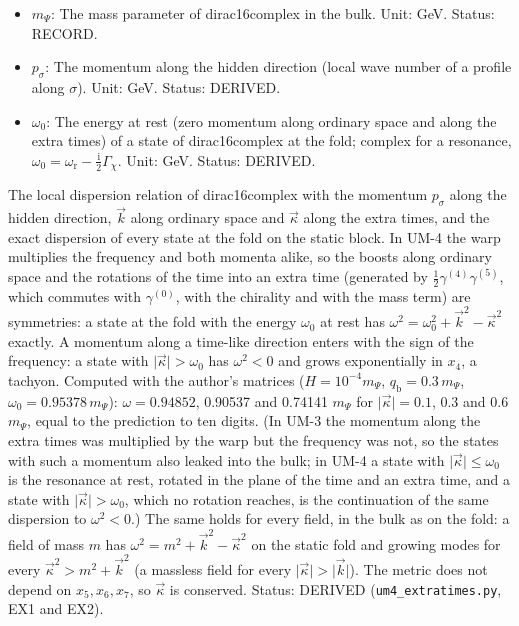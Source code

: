 \documentclass[
  10pt,
]{article}
\begin{document}
\begin{itemize}
  DERIVED.
\item
  \(m_\Psi\): The mass parameter of dirac16complex in the bulk. Unit:
  GeV. Status: RECORD.
\item
  \(p_\sigma\): The momentum along the hidden direction (local wave
  number of a profile along \(\sigma\)). Unit: GeV. Status: DERIVED.
\item
  \(\omega_0\): The energy at rest (zero momentum along ordinary space
  and along the extra times) of a state of dirac16complex at the fold;
  complex for a resonance,
  \(\omega_0 = \omega_{\mathrm{r}} - \frac{\mathrm{i}}{2}\Gamma_\chi\).
  Unit: GeV. Status: DERIVED.
\end{itemize}

The local dispersion relation of dirac16complex with the momentum
\(p_\sigma\) along the hidden direction, \(\vec k\) along ordinary space
and \(\vec\kappa\) along the extra times, and the exact dispersion of
every state at the fold on the static block. In UM-4 the warp multiplies
the frequency and both momenta alike, so the boosts along ordinary space
and the rotations of the time into an extra time (generated by
\(\frac12\gamma^{(4)}\gamma^{(5)}\), which commutes with
\(\gamma^{(0)}\), with the chirality and with the mass term) are
symmetries: a state at the fold with the energy \(\omega_0\) at rest has
\(\omega^2 = \omega_0^2 + \vec k^2 - \vec\kappa^2\) exactly. A momentum
along a time-like direction enters with the sign of the frequency: a
state with \(\lvert\vec\kappa\rvert > \omega_0\) has \(\omega^2 < 0\)
and grows exponentially in \(x_4\), a tachyon. Computed with the
author's matrices (\(H = 10^{-4}m_\Psi\),
\(q_{\mathrm{b}} = 0.3\,m_\Psi\), \(\omega_0 = 0.95378\,m_\Psi\)):
\(\omega = 0.94852\), 0.90537 and 0.74141 \(m_\Psi\) for
\(\lvert\vec\kappa\rvert = 0.1\), 0.3 and 0.6 \(m_\Psi\), equal to the
prediction to ten digits. (In UM-3 the momentum along the extra times
was multiplied by the warp but the frequency was not, so the states with
such a momentum also leaked into the bulk; in UM-4 a state with
\(\lvert\vec\kappa\rvert \le \omega_0\) is the resonance at rest,
rotated in the plane of the time and an extra time, and a state with
\(\lvert\vec\kappa\rvert > \omega_0\), which no rotation reaches, is the
continuation of the same dispersion to \(\omega^2 < 0\).) The same holds
for every field, in the bulk as on the fold: a field of mass \(m\) has
\(\omega^2 = m^2 + \vec k^2 - \vec\kappa^2\) on the static fold and
growing modes for every \(\vec\kappa^2 > m^2 + \vec k^2\) (a massless
field for every \(\lvert\vec\kappa\rvert > \lvert\vec k\rvert\)). The
metric does not depend on \(x_5, x_6, x_7\), so \(\vec\kappa\) is
conserved. Status: DERIVED (\texttt{um4\_extratimes.py}, EX1 and EX2).
\end{document}
